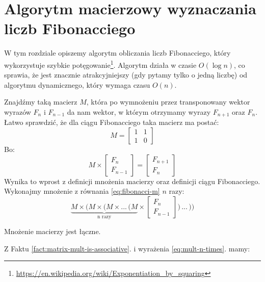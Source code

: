 \section{Algorytm macierzowy wyznaczania liczb Fibonacciego}

W tym rozdziale opiszemy algorytm obliczania liczb Fibonacciego, który wykorzystuje szybkie potęgowanie\footnote{\url{https://en.wikipedia.org/wiki/Exponentiation_by_squaring}}.
Algorytm działa w czasie $O(\log{n})$, co sprawia, że jest znacznie atrakcyjniejszy (gdy pytamy tylko o jedną liczbę) od algorytmu dynamicznego, który wymaga czasu $O(n)$.

Znajdźmy taką macierz $M$, która po wymnożeniu przez transponowany wektor wyrazów $F_{n}$ i $F_{n - 1}$ da nam wektor, w którym otrzymamy wyrazy $F_{n + 1}$ oraz $F_{n}$. 
Łatwo sprawdzić, że dla ciągu Fibonacciego taka macierz ma postać:
\begin{equation*}
  M = \begin{bmatrix}1 & 1 \\ 1 & 0\end{bmatrix}
\end{equation*}
Bo:
\begin{equation}
  \label{eq:fibonacci-m}
  M \times
  \begin{bmatrix}F_n \\ F_{n - 1}\end{bmatrix}
  = \begin{bmatrix}F_{n + 1} \\ F_{n}\end{bmatrix}
\end{equation}
Wynika to wprost z definicji mnożenia macierzy oraz definicji ciągu Fibonacciego.
Wykonajmy mnożenie z równania \ref{eq:fibonacci-m} $n$ razy:
\begin{equation}
  \label{eq:mult-n-times}
  \underbrace{M \times (M \times (M \times ...\,(M}_\text{n razy}
  \times
  \begin{bmatrix}F_n \\ F_{n - 1}\end{bmatrix})\,...\,))
\end{equation}
\begin{fact}{Mnożenie macierzy jest łączne.}
  \label{fact:matrix-mult-is-associative}
\end{fact}
Z Faktu \ref{fact:matrix-mult-is-associative}. i wyrażenia \ref{eq:mult-n-times}. mamy:
